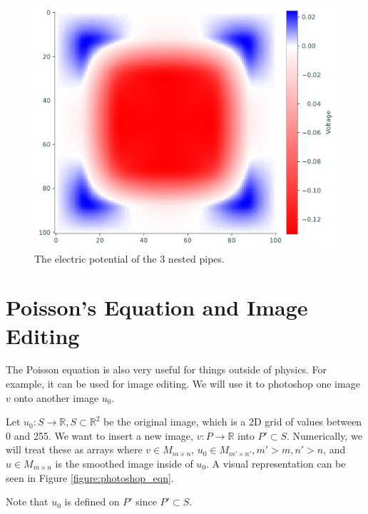 \begin{figure}
\includegraphics[scale=0.7]{figures/potential.pdf}
\caption{The electric potential of the 3 nested pipes.}
\label{poisson:fig:poisson-square}
\end{figure}

\section*{Poisson's Equation and Image Editing}
The Poisson equation is also very useful for things outside of physics.
For example, it can be used for image editing.
We will use it to photoshop one image $v$ onto another image $u_0$.

Let $u_0:  S \rightarrow \mathbb{R}, S \subset \mathbb{R}^2$ be the original image, which is a 2D grid of values between 0 and 255.
We want to insert a new image, $v: P\rightarrow \mathbb{R}$ into $P' \subset S$.
Numerically, we will treat these as arrays where $v\in M_{m\times n}$, $u_0\in M_{m'\times n'}, m'>m, n'>n$, and $u \in M_{m\times n}$ is the smoothed image inside of $u_0$.
A visual representation can be seen in Figure \ref{figure:photoshop_eqn}.

\begin{warn}
Note that $u_0$ is defined on $P'$ since $P' \subset S$.
\end{warn}


